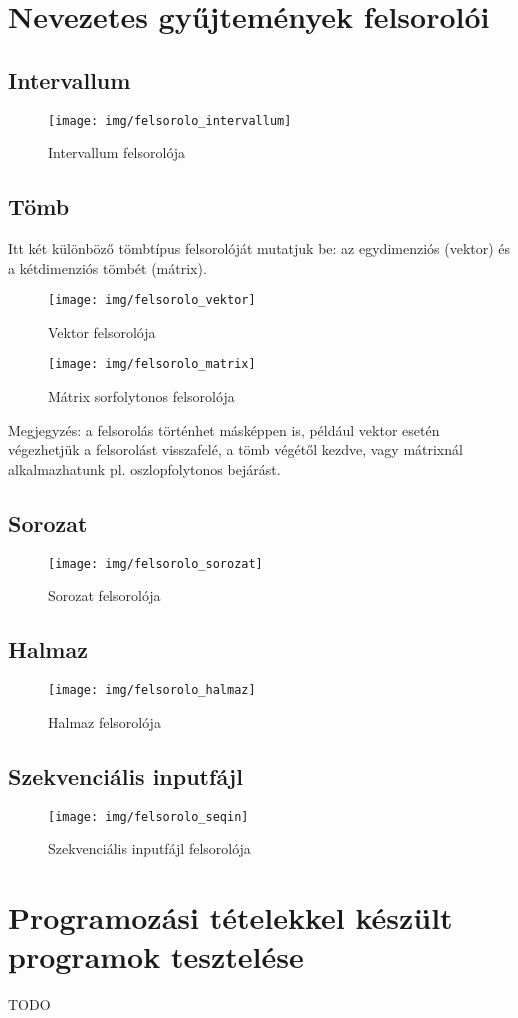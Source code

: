 \documentclass[margin=0px]{article}
\begin{document}


\section{Nevezetes gyűjtemények felsorolói}

\subsection{Intervallum}
\begin{figure}[H]
    \centering
    \texttt{[image: img/felsorolo\_intervallum]}
    \caption{Intervallum felsorolója}
    \label{fig:felsorolo_intervallum}
\end{figure}

\subsection{Tömb}
Itt két különböző tömbtípus felsorolóját mutatjuk be: az egydimenziós (vektor) és a kétdimenziós tömbét (mátrix).

\begin{figure}[H]
    \centering
    \texttt{[image: img/felsorolo\_vektor]}
    \caption{Vektor felsorolója}
    \label{fig:felsorolo_vektor}
\end{figure}

\begin{figure}[H]
    \centering
    \texttt{[image: img/felsorolo\_matrix]}
    \caption{Mátrix sorfolytonos felsorolója}
    \label{fig:felsorolo_matrix}
\end{figure}

Megjegyzés: a felsorolás történhet másképpen is, például vektor esetén végezhetjük a felsorolást visszafelé, a tömb végétől kezdve, vagy mátrixnál alkalmazhatunk pl. oszlopfolytonos bejárást.

\subsection{Sorozat}
\begin{figure}[H]
    \centering
    \texttt{[image: img/felsorolo\_sorozat]}
    \caption{Sorozat felsorolója}
    \label{fig:felsorolo_sorozat}
\end{figure}

\subsection{Halmaz}
\begin{figure}[H]
    \centering
    \texttt{[image: img/felsorolo\_halmaz]}
    \caption{Halmaz felsorolója}
    \label{fig:felsorolo_halmaz}
\end{figure}

\subsection{Szekvenciális inputfájl}
\begin{figure}[H]
    \centering
    \texttt{[image: img/felsorolo\_seqin]}
    \caption{Szekvenciális inputfájl felsorolója}
    \label{fig:felsorolo_seqin}
\end{figure}

\section{Programozási tételekkel készült programok tesztelése}
TODO
\end{document}

